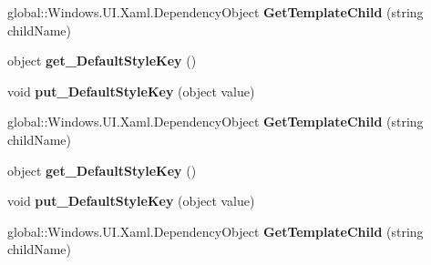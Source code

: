 \begin{DoxyCompactItemize}
\mbox{\label{interface_windows_1_1_u_i_1_1_xaml_1_1_controls_1_1_i_control_protected_a9d95d311e8cec4157bbe2bbd0ac7dc52}} 
global\+::\+Windows.\+U\+I.\+Xaml.\+Dependency\+Object {\bfseries Get\+Template\+Child} (string child\+Name)
\item 
\mbox{\label{interface_windows_1_1_u_i_1_1_xaml_1_1_controls_1_1_i_control_protected_a78726a340c2a165e8f7c5acade8d3ff7}} 
object {\bfseries get\+\_\+\+Default\+Style\+Key} ()
\item 
\mbox{\label{interface_windows_1_1_u_i_1_1_xaml_1_1_controls_1_1_i_control_protected_a1ed23ea3ade8e163b61a3df46fd2362e}} 
void {\bfseries put\+\_\+\+Default\+Style\+Key} (object value)
\item 
\mbox{\label{interface_windows_1_1_u_i_1_1_xaml_1_1_controls_1_1_i_control_protected_a9d95d311e8cec4157bbe2bbd0ac7dc52}} 
global\+::\+Windows.\+U\+I.\+Xaml.\+Dependency\+Object {\bfseries Get\+Template\+Child} (string child\+Name)
\item 
\mbox{\label{interface_windows_1_1_u_i_1_1_xaml_1_1_controls_1_1_i_control_protected_a78726a340c2a165e8f7c5acade8d3ff7}} 
object {\bfseries get\+\_\+\+Default\+Style\+Key} ()
\item 
\mbox{\label{interface_windows_1_1_u_i_1_1_xaml_1_1_controls_1_1_i_control_protected_a1ed23ea3ade8e163b61a3df46fd2362e}} 
void {\bfseries put\+\_\+\+Default\+Style\+Key} (object value)
\item 
\mbox{\label{interface_windows_1_1_u_i_1_1_xaml_1_1_controls_1_1_i_control_protected_a9d95d311e8cec4157bbe2bbd0ac7dc52}} 
global\+::\+Windows.\+U\+I.\+Xaml.\+Dependency\+Object {\bfseries Get\+Template\+Child} (string child\+Name)
\item 
\mbox{\label{interface_windows_1_1_u_i_1_1_xaml_1_1_controls_1_1_i_control_protected_a78726a340c2a165e8f7c5acade8d3ff7}} 

\end{DoxyCompactItemize}
